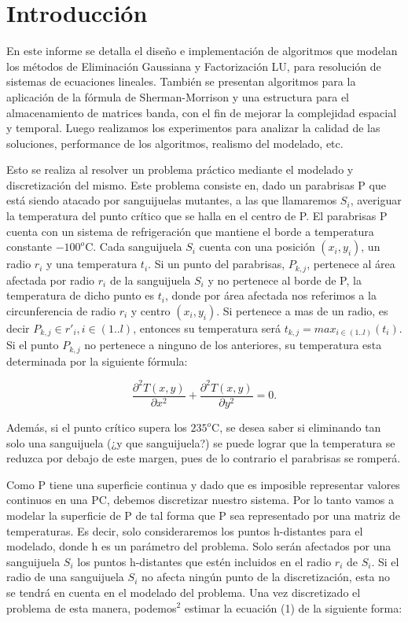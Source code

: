 \section{Introducción}

En este informe se detalla el diseño e implementación de algoritmos que modelan los métodos de Eliminación Gaussiana y Factorización LU, para resolución de sistemas de ecuaciones lineales. También se presentan algoritmos para la aplicación de la fórmula de Sherman-Morrison y una estructura para el almacenamiento de matrices banda, con el fin de mejorar la complejidad espacial y temporal. Luego realizamos los experimentos para analizar la calidad de las soluciones, performance de los algoritmos, realismo del modelado, etc.

Esto se realiza al resolver un problema práctico mediante el modelado y discretización del mismo. Este problema consiste en, dado un parabrisas P que está siendo atacado por sanguijuelas mutantes, a las que llamaremos $S_i$, averiguar la temperatura del punto crítico que se halla en el centro de P. El parabrisas P cuenta con un sistema de refrigeración que mantiene el borde a temperatura constante $-100^o$C. Cada sanguijuela $S_i$ cuenta con una posición $(x_i, y_i)$, un radio $r_i$ y una temperatura $t_i$. Si un punto del parabrisas, $P_{k,j}$, pertenece al área afectada por radio $r_i$ de la sanguijuela $S_i$ y no pertenece al borde de P, la temperatura de dicho punto es $t_i$, donde por área afectada nos referimos a la circunferencia de radio $r_i $ y centro $(x_i, y_i)$. Si pertenece a mas de un radio, es decir $P_{k,j} \in {r'_i}, i\in (1..l) $, entonces su temperatura será  $t_{k,j}=max_{i\in (1..l)}(t_i) $. Si el punto $P_{k,j}$ no pertenece a ninguno de los anteriores, su temperatura esta determinada por la siguiente fórmula:

\begin{equation}\label{eq:calor}
\frac{\partial^2T(x,y)}{\partial x^{2}}+\frac{\partial^2 T(x,y)}{\partial y^{2}} = 0.
\end{equation}

Además, si el punto crítico supera los $235^o $C, se desea saber si eliminando tan solo una sanguijuela (¿y que sanguijuela?) se puede lograr que la temperatura se reduzca por debajo de este margen, pues de lo contrario el parabrisas se romperá.

Como P tiene una superficie continua y dado que es imposible representar valores continuos en una PC, debemos discretizar nuestro sistema. Por lo tanto vamos a modelar la superficie de P de tal forma que P sea representado por una matriz de temperaturas. Es decir, solo consideraremos los puntos h-distantes para el modelado, donde h es un parámetro del problema. 
Solo serán afectados por una sanguijuela $S_i$ los puntos h-distantes que estén incluidos en el radio $r_i$ de $S_i$. Si el radio de una sanguijuela $S_i$ no afecta ningún punto de la discretización, esta no se tendrá en cuenta en el modelado del problema. Una vez discretizado el problema de esta manera, podemos$^2$ estimar la ecuación (1) de la siguiente forma:

